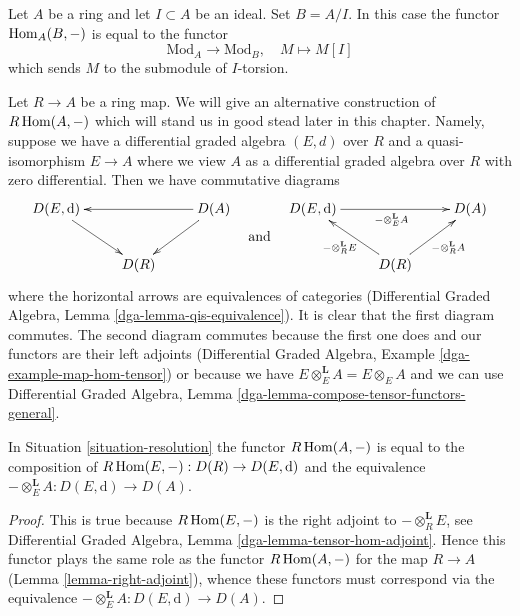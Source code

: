 \begin{remark}
\label{remark-exact-support}
Let $A$ be a ring and let $I \subset A$ be an ideal. Set $B = A/I$.
In this case the functor $\mathop{\mathrm{Hom}}\nolimits_A(B, -)$ is equal to the functor
$$
\text{Mod}_A \longrightarrow \text{Mod}_B,\quad M \longmapsto M[I]
$$
which sends $M$ to the submodule of $I$-torsion.
\end{remark}

\begin{situation}
\label{situation-resolution}
Let $R \to A$ be a ring map.
We will give an alternative construction of $R\mathop{\mathrm{Hom}}\nolimits(A, -)$
which will stand us in good stead later in this chapter.
Namely, suppose we have a differential graded algebra $(E, d)$
over $R$ and a quasi-isomorphism $E \to A$ where we view $A$
as a differential graded algebra over $R$ with zero differential.
Then we have commutative diagrams
$$
\vcenter{
\xymatrix{
D(E, \text{d}) \ar[rd] & &  D(A) \ar[ll] \ar[ld] \\
& D(R)
}
}
\quad\text{and}\quad
\vcenter{
\xymatrix{
D(E, \text{d}) \ar[rr]_{- \otimes_E^\mathbf{L} A} & &  D(A) \\
& D(R) \ar[lu]^{- \otimes_R^\mathbf{L} E} \ar[ru]_{- \otimes_R^\mathbf{L} A}
}
}
$$
where the horizontal arrows are equivalences of categories
(Differential Graded Algebra, Lemma \ref{dga-lemma-qis-equivalence}).
It is clear that the first diagram commutes.
The second diagram commutes because the first one does
and our functors are their left adjoints
(Differential Graded Algebra, Example \ref{dga-example-map-hom-tensor})
or because we have $E \otimes^\mathbf{L}_E A = E \otimes_E A$
and we can use 
Differential Graded Algebra, Lemma
\ref{dga-lemma-compose-tensor-functors-general}.
\end{situation}

\begin{lemma}
\label{lemma-RHom-dga}
In Situation \ref{situation-resolution} the functor $R\mathop{\mathrm{Hom}}\nolimits(A, -)$
is equal to the composition of
$R\mathop{\mathrm{Hom}}\nolimits(E, -) : D(R) \to D(E, \text{d})$
and the equivalence $- \otimes^\mathbf{L}_E A : D(E, \text{d}) \to D(A)$.
\end{lemma}

\begin{proof}
This is true because $R\mathop{\mathrm{Hom}}\nolimits(E, -)$ is the right adjoint
to $- \otimes^\mathbf{L}_R E$, see
Differential Graded Algebra, Lemma \ref{dga-lemma-tensor-hom-adjoint}.
Hence this functor plays the same role as the functor
$R\mathop{\mathrm{Hom}}\nolimits(A, -)$ for the map $R \to A$ (Lemma \ref{lemma-right-adjoint}),
whence these functors must correspond via the equivalence
$- \otimes^\mathbf{L}_E A : D(E, \text{d}) \to D(A)$.
\end{proof}

